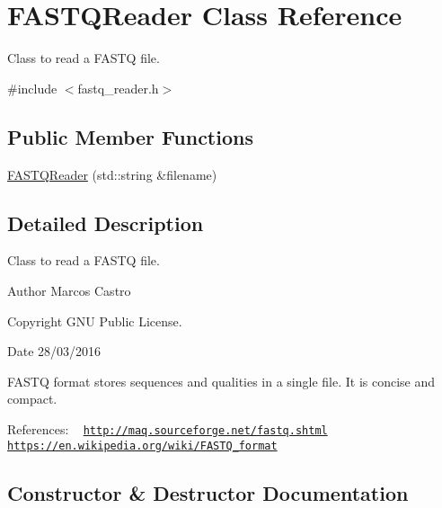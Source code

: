 \hypertarget{class_f_a_s_t_q_reader}{}\section{F\+A\+S\+T\+Q\+Reader Class Reference}
\label{class_f_a_s_t_q_reader}


Class to read a F\+A\+S\+TQ file.  




{\ttfamily \#include $<$fastq\+\_\+reader.\+h$>$}

\subsection*{Public Member Functions}
\begin{DoxyCompactItemize}
\item 
\hyperlink{class_f_a_s_t_q_reader_a794202383b7c9a5ed978bf6e27a86248}{F\+A\+S\+T\+Q\+Reader} (std\+::string \&filename)
\end{DoxyCompactItemize}


\subsection{Detailed Description}
Class to read a F\+A\+S\+TQ file. 

\begin{DoxyAuthor}{Author}
Marcos Castro 
\end{DoxyAuthor}
\begin{DoxyCopyright}{Copyright}
G\+NU Public License. 
\end{DoxyCopyright}
\begin{DoxyDate}{Date}
28/03/2016
\end{DoxyDate}
F\+A\+S\+TQ format stores sequences and qualities in a single file. It is concise and compact.

References\+: ~\newline
 \href{http://maq.sourceforge.net/fastq.shtml}{\tt http\+://maq.\+sourceforge.\+net/fastq.\+shtml} ~\newline
 \href{https://en.wikipedia.org/wiki/FASTQ_format}{\tt https\+://en.\+wikipedia.\+org/wiki/\+F\+A\+S\+T\+Q\+\_\+format} 

\subsection{Constructor \& Destructor Documentation}
